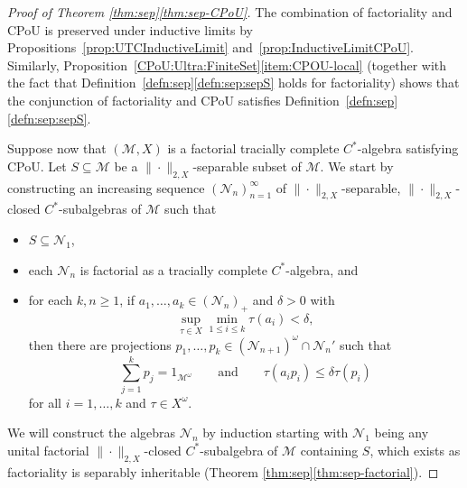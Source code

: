 \documentclass[a4paper,11pt]{amsart}
\theoremstyle{definition}
\numberwithin{equation}{section}
\numberwithin{theorem}{section}
\newcommand{\M}{\mathcal{M}}
\begin{document}
\begin{proof}[Proof of Theorem \ref{thm:sep}\ref{thm:sep-CPoU}]
	The combination of factoriality and CPoU  is preserved under inductive limits by Propositions~\ref{prop:UTCInductiveLimit} and~\ref{prop:InductiveLimitCPoU}. Similarly, Proposition~\ref{CPoU:Ultra:FiniteSet}\ref{item:CPOU-local} (together with the fact that Definition~\ref{defn:sep}\ref{defn:sep:sepS} holds for factoriality) shows that the conjunction of factoriality and CPoU satisfies Definition~\ref{defn:sep}\ref{defn:sep:sepS}.
 
	Suppose now that $(\M, X)$ is a factorial tracially complete $C^*$-algebra satisfying CPoU.  Let $S \subseteq \M$ be a  $\|\cdot\|_{2, X}$-separable subset of $\M$.  We start by constructing an increasing sequence $(\mathcal{N}_n)_{n=1}^\infty $ of $\|\cdot\|_{2, X}$-separable, $\|\cdot\|_{2, X}$-closed $C^*$-subalgebras of $\M$ such that
	\begin{itemize}
		\item  $S \subseteq \mathcal{N}_1$,
		\item each $\mathcal{N}_n$ is factorial as a tracially complete $C^*$-algebra, and
		\item for each $k, n \geq 1$, if $a_1, \ldots, a_k \in (\mathcal{N}_n)_+$ and $\delta > 0$ with
		\begin{equation}
			\sup_{\tau \in X} \min_{1 \leq i \leq k} \tau(a_i) < \delta,
		\end{equation}
		then there are projections $p_1, \ldots, p_k \in (\mathcal{N}_{n+1})^\omega \cap \mathcal{N}_n'$ such that
		\begin{equation}
			\sum_{j=1}^k p_j = 1_{\mathcal M^\omega} \qquad \text{and} \qquad \tau(a_i p_i) \leq \delta \tau(p_i)
		\end{equation}
		for all $i = 1, \ldots, k$ and $\tau \in X^\omega$.
	\end{itemize}
	We will construct the algebras $\mathcal{N}_n$ by induction starting with $\mathcal{N}_1$ being any unital factorial $\|\cdot\|_{2, X}$-closed $C^*$-subalgebra of $\M$ containing $S$, which exists as factoriality is separably inheritable (Theorem \ref{thm:sep}\ref{thm:sep-factorial}).
	

\end{proof}
\end{document}
